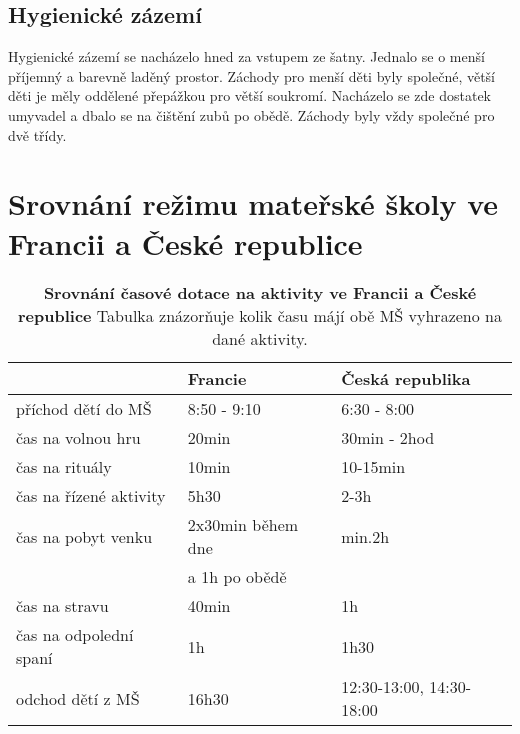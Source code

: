 		\subsection{Hygienické zázemí}
			Hygienické zázemí se nacházelo hned za vstupem ze šatny. Jednalo se o menší příjemný a barevně laděný prostor. Záchody pro menší děti byly společné, větší děti je měly oddělené přepážkou pro větší soukromí. Nacházelo se zde dostatek umyvadel a dbalo se na čištění zubů po obědě. Záchody byly vždy společné pro dvě třídy. 

\section{Srovnání režimu mateřské školy ve Francii a České republice} 
\label{srovnani} 

\begin{table}[h]
	
	\begin{tabular}{|l|l|l|}
	\hline
	\rowcolor{grey}
								& \textbf{Francie}				& \textbf{Česká republika}	\\
	\hline
	\hline
\rowcolor{grey!10}	 příchod dětí do MŠ			& 8:50 - 9:10				& 6:30 - 8:00			\\ 
\rowcolor{grey!50}	 čas na volnou hru 			& 20min 					&30min - 2hod 	\\ 
\rowcolor{grey!10}	 čas na rituály 			&10min 						&10-15min \\
\rowcolor{grey!50}	 čas na řízené aktivity		&5h30 						&2-3h   \\ 
\rowcolor{grey!10}	 čas na pobyt venku     	&2x30min během dne			&min.2h 	\\ 
\rowcolor{grey!10}								&a 1h po obědě				& \\ 
\rowcolor{grey!50}	 čas na stravu				&40min						&1h \\
\rowcolor{grey!10}	 čas na odpolední spaní 	&1h 						&1h30 	\\
\rowcolor{grey!50}	 odchod dětí z MŠ			&16h30						&12:30-13:00, 14:30-18:00	\\														 
	 \hline
	  
	\end{tabular}
	
	\caption{ \textbf{Srovnání časové dotace na aktivity ve Francii a České republice} Tabulka znázorňuje kolik času májí obě MŠ vyhrazeno na dané aktivity.
	}
	\label{srovnanirezimdne}
\end{table}



